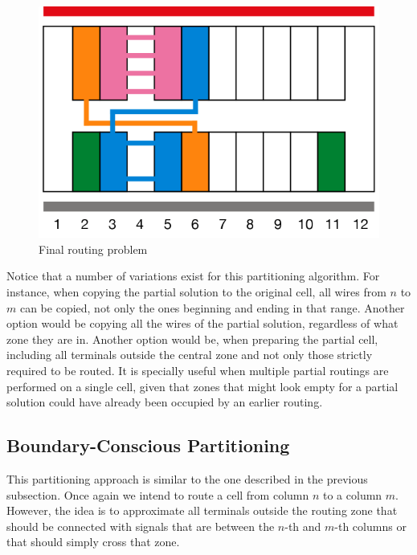 \begin{figure}[h!]
  \centering
  \includegraphics[scale=0.5]{img/design/RealFinal.png}
  \caption{Final routing problem}
  \label{fig:realfinal}
\end{figure} 

Notice that a number of variations exist for this partitioning algorithm. For instance, when copying the partial solution to the original cell, all wires from $n$ to $m$ can be copied, not only the ones beginning and ending in that range. Another option would be copying all the wires of the partial solution, regardless of what zone they are in. Another option would be, when preparing the partial cell, including all terminals outside the central zone and not only those strictly required to be routed. It is specially useful when multiple partial routings are performed on a single cell, given that zones that might look empty for a partial solution could have already been occupied by an earlier routing.  \\

\subsection{Boundary-Conscious Partitioning}

This partitioning approach is similar to the one described in the previous subsection. Once again we intend to route a cell from column $n$ to a column $m$. However, the idea is to approximate all terminals outside the routing zone that should be connected with signals that are between the $n$-th and $m$-th columns or that should simply cross that zone. \\

